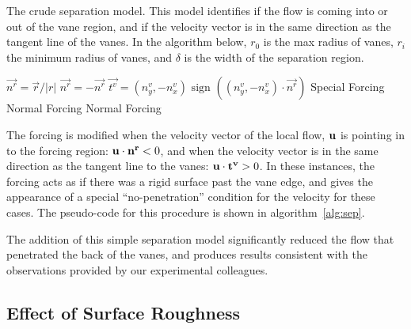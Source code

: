 %
%
\begin{center}
 \begin{algorithm}
  \caption{The crude separation model. This model identifies if the flow
  is coming into or out of the vane region, and if the velocity vector
  is in the same direction as the tangent line of the vanes. In the
  algorithm below, $r_0$ is the max radius of vanes, $r_i$ the minimum
  radius of vanes, and $\delta$ is the width of the separation region.}
  \label{alg:sep}
  \begin{algorithmic}[1]
   \State $\overrightarrow{n^r} = \overrightarrow{r}/|r|$
   \State $\overrightarrow{n^r} = -\overrightarrow{n^r}$
   \EndIf
   \State $\overrightarrow{t^v} = (n_y^v , -n_x^v) \text{ sign
   }((n_y^v,-n_x^v) \cdot \overrightarrow{n^r})$
   \State Special Forcing
   \Else
   \State Normal Forcing
   \EndIf
   \Else
   \State Normal Forcing
   \EndIf
   \EndIf
  \end{algorithmic}
 \end{algorithm}
\end{center}
%

The forcing is modified when the velocity vector of the local flow, $\bf
u$ is pointing in to the forcing region: ${\bf u} \cdot {\bf n^r} < 0$, and
when the velocity vector is in the same direction as the tangent line to
the vanes: ${\bf u} \cdot {\bf t^v} > 0 $. In these instances, the
forcing acts as if there was a rigid surface past the vane edge, and
gives the appearance of a special ``no-penetration'' condition for the
velocity for these cases. The pseudo-code for this procedure is shown in
algorithm~\ref{alg:sep}.

The addition of this simple separation model significantly reduced the
flow that penetrated the back of the vanes, and produces results
consistent with the observations provided by our experimental
colleagues.  

\subsection{Effect of Surface Roughness}


